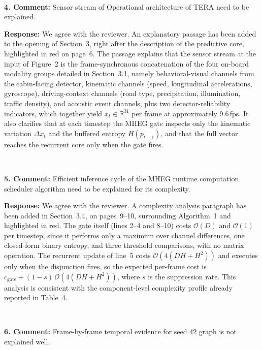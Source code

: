 \documentclass[1p,12pt,authoryear]{elsarticle}
\begin{document}
~

\noindent \textbf{4. Comment:} Sensor stream of Operational architecture of TERA need to be explained.

\vspace{2mm}
\noindent \textbf{Response:} We agree with the reviewer. An explanatory passage has been added to the opening of Section~3, right after the description of the predictive core, highlighted in red on page~6. The passage explains that the sensor stream at the input of Figure~2 is the frame-synchronous concatenation of the four on-board modality groups detailed in Section~3.1, namely behavioral-visual channels from the cabin-facing detector, kinematic channels (speed, longitudinal accelerations, gyroscope), driving-context channels (road type, precipitation, illumination, traffic density), and acoustic event channels, plus two detector-reliability indicators, which together yield $x_t \in \mathbb{R}^{31}$ per frame at approximately 9.6\,fps. It also clarifies that at each timestep the MHEG gate inspects only the kinematic variation $\Delta x_t$ and the buffered entropy $H(p_{t-1})$, and that the full vector reaches the recurrent core only when the gate fires.

~

\noindent \textbf{5. Comment:} Efficient inference cycle of the MHEG runtime computation scheduler algorithm need to be explained for its complexity.

\vspace{2mm}
\noindent \textbf{Response:} We agree with the reviewer. A complexity analysis paragraph has been added in Section~3.4, on pages~9--10, surrounding Algorithm~1 and highlighted in red. The gate itself (lines 2--4 and 8--10) costs $\mathcal{O}(D)$ and $\mathcal{O}(1)$ per timestep, since it performs only a maximum over channel differences, one closed-form binary entropy, and three threshold comparisons, with no matrix operation. The recurrent update of line~5 costs $\mathcal{O}(4(DH{+}H^2))$ and executes only when the disjunction fires, so the expected per-frame cost is $c_{\mathrm{gate}} + (1-s)\,\mathcal{O}(4(DH{+}H^2))$, where $s$ is the suppression rate. This analysis is consistent with the component-level complexity profile already reported in Table~4.

~

\noindent \textbf{6. Comment:} Frame-by-frame temporal evidence for seed 42 graph is not explained well.
\end{document}
